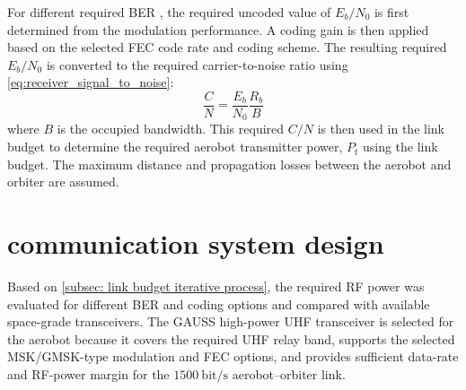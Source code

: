For different required BER , the required uncoded value of $E_b/N_0$ is first determined from the modulation performance. A coding gain is then applied based on the selected FEC code rate and coding scheme. The resulting required $E_b/N_0$ is converted to the required carrier-to-noise ratio using \autoref{eq:receiver_signal_to_noise}:
\begin{equation}
    \frac{C}{N} = \frac{E_b}{N_0}\frac{R_b}{B}
    \label{eq:receiver_signal_to_noise}
\end{equation}
where $B$ is the occupied bandwidth. This required $C/N$ is then used in the link budget to determine the required aerobot transmitter power, $P_t$ using the link budget. The maximum distance and propagation losses between the aerobot and orbiter are assumed. 

\section{communication system design}
Based on \autoref{subsec: link budget iterative process}, the required RF power was evaluated for different BER and coding options and compared with available space-grade transceivers. The GAUSS high-power UHF transceiver is selected for the aerobot because it covers the required UHF relay band, supports the selected MSK/GMSK-type modulation and FEC options, and provides sufficient data-rate and RF-power margin for the \(1500~\mathrm{bit/s}\) aerobot--orbiter link.


